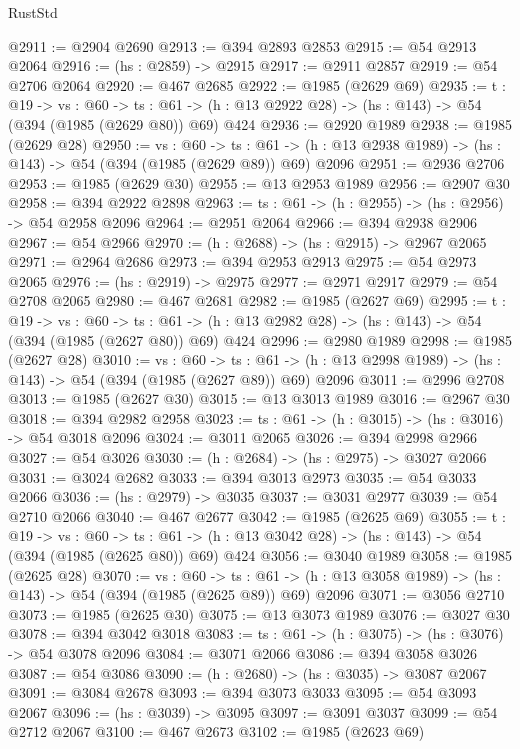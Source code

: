 \begin{lexlean}{RustStd}
\begin{coremodule}
@2911 := @2904 @2690
@2913 := @394 @2893 @2853
@2915 := @54 @2913 @2064
@2916 := (hs : @2859) -> @2915
@2917 := @2911 @2857
@2919 := @54 @2706 @2064
@2920 := @467 @2685
@2922 := @1985 (@2629 @69)
@2935 := {t : @19} ->
  {vs : @60} ->
  {ts : @61} -> (h : @13 @2922 @28) -> (hs : @143) -> @54 (@394 (@1985 (@2629 @80)) @69) @424
@2936 := @2920 @1989
@2938 := @1985 (@2629 @28)
@2950 := {vs : @60} ->
  {ts : @61} -> (h : @13 @2938 @1989) -> (hs : @143) -> @54 (@394 (@1985 (@2629 @89)) @69) @2096
@2951 := @2936 @2706
@2953 := @1985 (@2629 @30)
@2955 := @13 @2953 @1989
@2956 := @2907 @30
@2958 := @394 @2922 @2898
@2963 := {ts : @61} -> (h : @2955) -> (hs : @2956) -> @54 @2958 @2096
@2964 := @2951 @2064
@2966 := @394 @2938 @2906
@2967 := @54 @2966
@2970 := (h : @2688) -> (hs : @2915) -> @2967 @2065
@2971 := @2964 @2686
@2973 := @394 @2953 @2913
@2975 := @54 @2973 @2065
@2976 := (hs : @2919) -> @2975
@2977 := @2971 @2917
@2979 := @54 @2708 @2065
@2980 := @467 @2681
@2982 := @1985 (@2627 @69)
@2995 := {t : @19} ->
  {vs : @60} ->
  {ts : @61} -> (h : @13 @2982 @28) -> (hs : @143) -> @54 (@394 (@1985 (@2627 @80)) @69) @424
@2996 := @2980 @1989
@2998 := @1985 (@2627 @28)
@3010 := {vs : @60} ->
  {ts : @61} -> (h : @13 @2998 @1989) -> (hs : @143) -> @54 (@394 (@1985 (@2627 @89)) @69) @2096
@3011 := @2996 @2708
@3013 := @1985 (@2627 @30)
@3015 := @13 @3013 @1989
@3016 := @2967 @30
@3018 := @394 @2982 @2958
@3023 := {ts : @61} -> (h : @3015) -> (hs : @3016) -> @54 @3018 @2096
@3024 := @3011 @2065
@3026 := @394 @2998 @2966
@3027 := @54 @3026
@3030 := (h : @2684) -> (hs : @2975) -> @3027 @2066
@3031 := @3024 @2682
@3033 := @394 @3013 @2973
@3035 := @54 @3033 @2066
@3036 := (hs : @2979) -> @3035
@3037 := @3031 @2977
@3039 := @54 @2710 @2066
@3040 := @467 @2677
@3042 := @1985 (@2625 @69)
@3055 := {t : @19} ->
  {vs : @60} ->
  {ts : @61} -> (h : @13 @3042 @28) -> (hs : @143) -> @54 (@394 (@1985 (@2625 @80)) @69) @424
@3056 := @3040 @1989
@3058 := @1985 (@2625 @28)
@3070 := {vs : @60} ->
  {ts : @61} -> (h : @13 @3058 @1989) -> (hs : @143) -> @54 (@394 (@1985 (@2625 @89)) @69) @2096
@3071 := @3056 @2710
@3073 := @1985 (@2625 @30)
@3075 := @13 @3073 @1989
@3076 := @3027 @30
@3078 := @394 @3042 @3018
@3083 := {ts : @61} -> (h : @3075) -> (hs : @3076) -> @54 @3078 @2096
@3084 := @3071 @2066
@3086 := @394 @3058 @3026
@3087 := @54 @3086
@3090 := (h : @2680) -> (hs : @3035) -> @3087 @2067
@3091 := @3084 @2678
@3093 := @394 @3073 @3033
@3095 := @54 @3093 @2067
@3096 := (hs : @3039) -> @3095
@3097 := @3091 @3037
@3099 := @54 @2712 @2067
@3100 := @467 @2673
@3102 := @1985 (@2623 @69)

\end{coremodule}
\end{lexlean}
